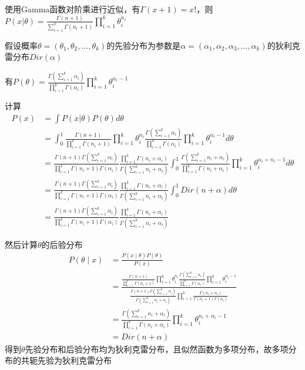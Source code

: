 \documentclass[12pt, a4paper, oneside, fontset=windows]{ctexart}
\begin{document}
使用Gamma函数对阶乘进行近似，有$\Gamma(x+1) = x!$，则$P(x|\theta) = \frac{\Gamma(n+1)}{\sum_{i = 1}^{k} \Gamma(n_i + 1)} \prod_{i = 1}^{k} \theta_i^{n_i}$

假设概率$\theta = (\theta_1,\theta_2,...,\theta_k)$的先验分布为参数是$\alpha = (\alpha_1,\alpha_2,\alpha_3,...,\alpha_k)$的狄利克雷分布$Dir(\alpha)$

有$P(\theta) = \frac{\Gamma(\sum_{i = 1}^{k} \alpha_i)}{\prod_{i=1}^{k} \Gamma(\alpha_i)} \prod_{i = 1}^{k} \theta_i^{\alpha_{i} - 1}$

计算
\begin{align*}
P(x)& = \int P(x|\theta)P(\theta) d\theta\\
    & = \int_0^1 \frac{\Gamma(n+1)}{\prod_{i=1}^{k} \Gamma(n_i + 1)}\prod_{i=1}^{k} \theta_i^{n_i}  \frac{\Gamma(\sum_{i=1}^{k}\alpha_i)}{\prod_{i=1}^{k}\Gamma(\alpha_i)} \prod_{i=1}^{k}\theta_{i}^{\alpha_i - 1} d\theta\\
    & = \frac{\Gamma(n+1)\Gamma(\sum_{i=1}^{k}\alpha_i)}{\prod_{i=1}^{k} \Gamma(n_i + 1)\Gamma(\alpha_i)} \frac{\prod_{i=1}^{k} \Gamma(n_i + \alpha_i)}{\Gamma(\sum_{i=1}^{k} n_i + \alpha_i)} \int_0^1 \frac{\Gamma(\sum_{i=1}^{k} n_i + \alpha_i)}{\prod_{i=1}^{k} \Gamma(n_i + \alpha_i)} \prod_{i=1}^{k} \theta_i^{\alpha_i + n_i -1}d\theta\\
    & = \frac{\Gamma(n+1)\Gamma(\sum_{i=1}^{k}\alpha_i)}{\prod_{i=1}^{k} \Gamma(n_i + 1)\Gamma(\alpha_i)} \frac{\prod_{i=1}^{k} \Gamma(n_i + \alpha_i)}{\Gamma(\sum_{i=1}^{k} n_i + \alpha_i)} \int_0^1 Dir(n + \alpha)d\theta\\
    & = \frac{\Gamma(n+1)\Gamma(\sum_{i=1}^{k}\alpha_i)}{\prod_{i=1}^{k} \Gamma(n_i + 1)\Gamma(\alpha_i)} \frac{\prod_{i=1}^{k} \Gamma(n_i + \alpha_i)}{\Gamma(\sum_{i=1}^{k} n_i + \alpha_i)}
\end{align*}

然后计算$\theta$的后验分布
\begin{align*}
    P(\theta \mid x) &= \frac{P(x \mid \theta)P(\theta)}{P(x)}\\
    &=\frac{\frac{\Gamma(n+1)}{\prod_{i=1}^k \Gamma(n_i+1)}\prod_{i=1}^k \theta_i^{n_i}\frac{\Gamma(\sum_{i=1}^k \alpha_i)}{\prod_{i=1}^{k} \Gamma(\alpha_{i})} \prod_{i=1}^{k} \theta_{i}^{\alpha_{i}-1}}{\frac{\Gamma(n+1)\Gamma(\sum_{i=1}^k \alpha_i)}{\Gamma(\sum_{i=1}^k n_i+\alpha_{i})}\prod_{i=1}^{k} \frac{\Gamma(n_i+\alpha_{i})}{\Gamma(n_i+1)\Gamma(\alpha_i)}}\\
    &=\frac{\Gamma(\sum_{i=1}^k n_i+\alpha_i)}{\prod_{i=1}^{k}\Gamma(n_i+\alpha_{i})}\prod_{i=1}^{k} \theta_i^{n_i+\alpha_{i}-1}\\
    &=Dir(n+\alpha)
\end{align*}
得到$\theta$先验分布和后验分布均为狄利克雷分布，且似然函数为多项分布，故多项分布的共轭先验为狄利克雷分布
\end{document}
